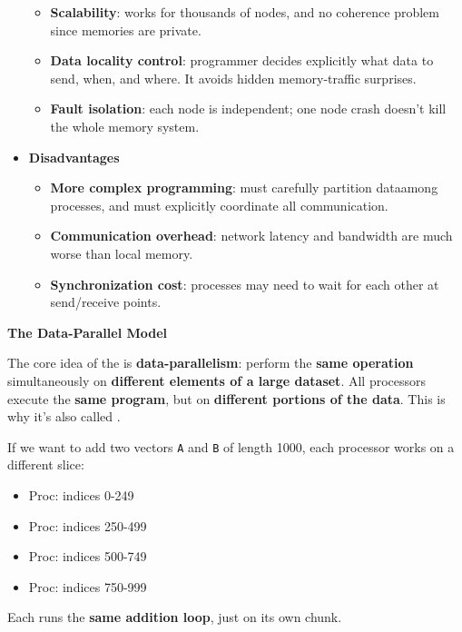 \begin{itemize}
\begin{itemize}
        \item[\textcolor{Green3}{\faIcon{check}}] \textbf{Scalability}: works for thousands of nodes, and no coherence problem since memories are private.
        \item[\textcolor{Green3}{\faIcon{check}}] \textbf{Data locality control}: programmer decides explicitly what data to send, when, and where. It avoids hidden memory-traffic surprises.
        \item[\textcolor{Green3}{\faIcon{check}}] \textbf{Fault isolation}: each node is independent; one node crash doesn't kill the whole memory system.
    \end{itemize}
    \newpage
    \item[\textcolor{Red2}{\faIcon{times-circle}}] \textcolor{Red2}{\textbf{Disadvantages}}
    \begin{itemize}
        \item[\textcolor{Red2}{\faIcon{times}}] \textbf{More complex programming}: must carefully partition data\break among processes, and must explicitly coordinate all communication.
        \item[\textcolor{Red2}{\faIcon{times}}] \textbf{Communication overhead}: network latency and bandwidth are much worse than local memory.
        \item[\textcolor{Red2}{\faIcon{times}}] \textbf{Synchronization cost}: processes may need to wait for each other at send/receive points.
    \end{itemize}
\end{itemize}

\highspace
\begin{flushleft}
    \textcolor{Green3}{\faIcon{\speedIcon} \textbf{The Data-Parallel Model}}
\end{flushleft}
The core idea of the  is \textbf{data-parallelism}: perform the \textbf{same operation} simultaneously on \textbf{different elements of a large dataset}. All processors execute the \textbf{same program}, but on \textbf{different portions of the data}. This is why it's also called .

\highspace
\begin{examplebox}
    If we want to add two vectors \texttt{A} and \texttt{B} of length 1000, each processor works on a different slice:
    \begin{itemize}
        \item Proc: indices 0-249
        \item Proc: indices 250-499
        \item Proc: indices 500-749
        \item Proc: indices 750-999
    \end{itemize}
    Each runs the \textbf{same addition loop}, just on its own chunk.
\end{examplebox}

